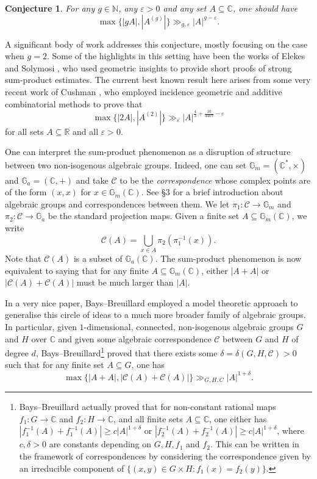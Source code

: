 \documentclass[12pt, reqno]{amsart}
\newcommand{\G}{\mathbb{G}}
\newcommand{\C}{\mathbb{C}}
\newtheorem{conjecture}[theorem]{Conjecture}
\theoremstyle{remark}
\theoremstyle{definition}
\numberwithin{equation}{section}
\begin{document}
\begin{conjecture} \label{erdszem}
    For any $g \in \mathbb{N}$, any $\varepsilon>0$ and any set $A \subseteq \mathbb{C}$, one should have
    \[ \max\{ |gA|, |A^{(g)}| \} \gg_{g, \varepsilon} |A|^{g - \varepsilon}. \]
\end{conjecture}

A significant body of work addresses this conjecture, mostly focusing on the case when $g=2$. Some of the highlights in this setting have been the works of Elekes \cite{El1997} and Solymosi \cite{So2009}, who used geometric insights to provide short proofs of strong sum-product estimates. The current best known result here arises from some very recent work of Cushman \cite{Cu2025}, who employed incidence geometric and additive combinatorial methods to prove that
\[ \max\{|2A|, |A^{(2)}| \} \gg_{\varepsilon} |A|^{\frac{4}{3} + \frac{10}{4407} - \varepsilon } \]
for all sets $A \subseteq \mathbb{R}$ and all $\varepsilon>0$.

One can interpret the sum-product phenomenon as a disruption of structure between two non-isogenous algebraic groups. Indeed, one can set $\mathbb{G}_m = (\mathbb{C}^\ast, \times)$ and $\mathbb{G}_a = (\mathbb{C}, +)$ and take $\mathcal{C}$ to be the \emph{correspondence} whose complex points are of the form $(x, x)$ for $x \in \mathbb{G}_m(\mathbb{C})$. See \S3 for a brief introduction about algebraic groups and correspondences between them. We let $\pi_1 : \mathcal{C} \to \G_m$ and $\pi_2:\mathcal{C}\to \G_a$ be the standard projection maps. Given a finite set $A \subseteq \G_m(\mathbb{C})$, we write
\[\mathcal{C}(A) = \bigcup_{x \in A} \pi_2(\pi_1^{-1}(x)) .\]
Note that $\mathcal{C}(A)$ is a subset of $\G_a(\mathbb{C})$. The sum-product phenomenon is now equivalent to saying that for any finite $A \subseteq \mathbb{G}_m(\mathbb{C})$, either $|A+A|$ or $|\mathcal{C}(A) +\mathcal{C}(A)|$ must be much larger than $|A|$.

In a very nice paper,  Bays--Breuillard \cite{BB2021} employed a model theoretic approach to generalise this circle of ideas to a much more broader family of algebraic groups. In particular, given $1$-dimensional, connected, non-isogenous algebraic groups $G$ and $H$ over $\C$ and given some algebraic correspondence $\mathcal{C}$ between $G$ and $H$ of degree $d$, Bays--Breuillard\footnote{Bays--Breuillard  \cite{BB2021} actually proved that for non-constant rational maps $f_1 : G \to \mathbb{C}$ and $f_2 : H \to \mathbb{C}$, and all finite sets $A \subseteq \C$, one either has $|f_1^{-1}(A) + f_1^{-1}(A)| \geq c |A|^{1 + \delta}$ or $|f_2^{-1}(A) + f_2^{-1}(A)| \geq c|A|^{1 + \delta}$, where $c,\delta>0$  are constants depending on $G,H, f_1$ and $f_2$. This can be written in the framework of correspondences by considering the correspondence given by an irreducible component of $\{(x,y) \in G \times H : f_1(x) = f_2(y)\}$.} proved that there exists some $\delta = \delta(G,H,\mathcal{C}) >0 $ such that for any finite set $A \subseteq G$, one has
\begin{equation} \label{bb19}
\max\{ |A+A| , |\mathcal{C}(A) +\mathcal{C}(A)| \} \gg_{G,H,C} |A|^{1 + \delta}. 
\end{equation}
\end{document}
